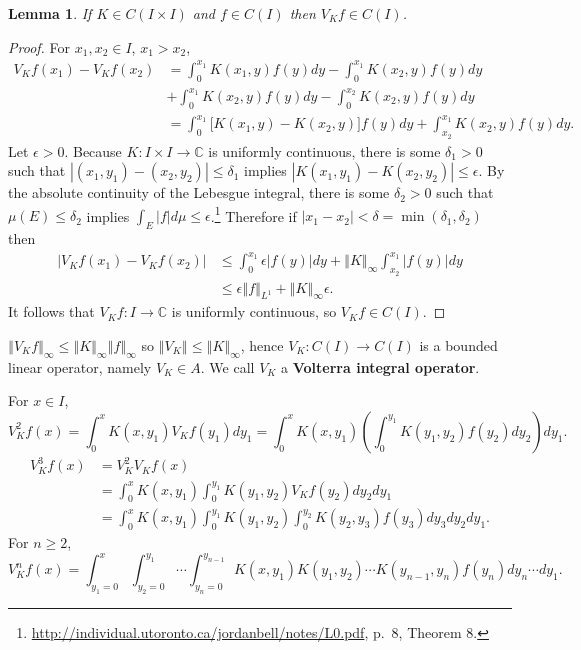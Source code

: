 \documentclass{article}
\newcommand{\norm}[1]{\left\Vert #1 \right\Vert}
\newtheorem{lemma}[theorem]{Lemma}
\theoremstyle{definition}
\begin{document}
\begin{lemma}
If $K \in C(I \times I)$ and 
$f \in C(I)$ then $V_Kf \in C(I)$.
\end{lemma}
\begin{proof}
For $x_1,x_2 \in I$, $x_1>x_2$,
\begin{align*}
V_Kf(x_1)-V_Kf(x_2)&=\int_0^{x_1}K(x_1,y)f(y)dy-\int_0^{x_1} K(x_2,y)f(y)dy\\
&+\int_0^{x_1} K(x_2,y)f(y)dy - \int_0^{x_2} K(x_2,y)f(y)dy\\
&=\int_0^{x_1} \bigg[K(x_1,y)-K(x_2,y)\bigg]f(y) dy
+\int_{x_2}^{x_1} K(x_2,y) f(y) dy.
\end{align*}
Let $\epsilon>0$. 
Because $K:I \times I \to \mathbb{C}$ is uniformly continuous, there is some
$\delta_1>0$ such that 
$|(x_1,y_1)-(x_2,y_2)| \leq \delta_1$ implies
$|K(x_1,y_1)-K(x_2,y_2)| \leq \epsilon$. 
By the absolute continuity of the Lebesgue integral, there is some $\delta_2>0$ such that 
$\mu(E) \leq \delta_2$ implies $\int_E |f| d\mu \leq \epsilon$.\footnote{\url{http://individual.utoronto.ca/jordanbell/notes/L0.pdf},
p.~8, Theorem 8.}
Therefore if
$|x_1-x_2|<\delta=\min(\delta_1,\delta_2)$ then
\begin{align*}
|V_Kf(x_1)-V_Kf(x_2)|&\leq \int_0^{x_1} \epsilon |f(y)| dy+\norm{K}_\infty \int_{x_2}^{x_1} |f(y)|dy\\
&\leq \epsilon \norm{f}_{L^1} +\norm{K}_\infty \epsilon.
\end{align*}
It follows that $V_Kf:I \to \mathbb{C}$ is uniformly continuous, so
$V_Kf \in C(I)$.
\end{proof}





$\norm{V_K f}_\infty \leq \norm{K}_\infty \norm{f}_\infty$ so $\norm{V_K} \leq \norm{K}_\infty$, hence $V_K:C(I) \to C(I)$ 
is a bounded linear operator, namely $V_K \in A$.
We call $V_K$ a \textbf{Volterra integral operator}.



For $x \in I$,
\[
V_K^2f(x) = \int_0^x K(x,y_1) V_K f(y_1) dy_1
=\int_0^x K(x,y_1) \left(\int_0^{y_1} K(y_1,y_2) f(y_2) dy_2\right) dy_1.
\]
\begin{align*}
V_K^3f(x) &=V_K^2 V_Kf(x)\\
&=\int_0^x K(x,y_1) \int_0^{y_1} K(y_1,y_2) V_Kf(y_2) dy_2 dy_1\\
&=\int_0^x K(x,y_1) \int_0^{y_1} K(y_1,y_2) \int_0^{y_2} K(y_2,y_3) f(y_3) dy_3 dy_2 dy_1.
\end{align*}
For $n \geq 2$,
\[
V_K^n f(x)=\int_{y_1=0}^x \int_{y_2=0}^{y_1} \cdots \int_{y_n=0}^{y_{n-1}} 
K(x,y_1) K(y_1,y_2)\cdots K(y_{n-1},y_n) f(y_n) dy_n \cdots dy_1.
\]
\end{document}
